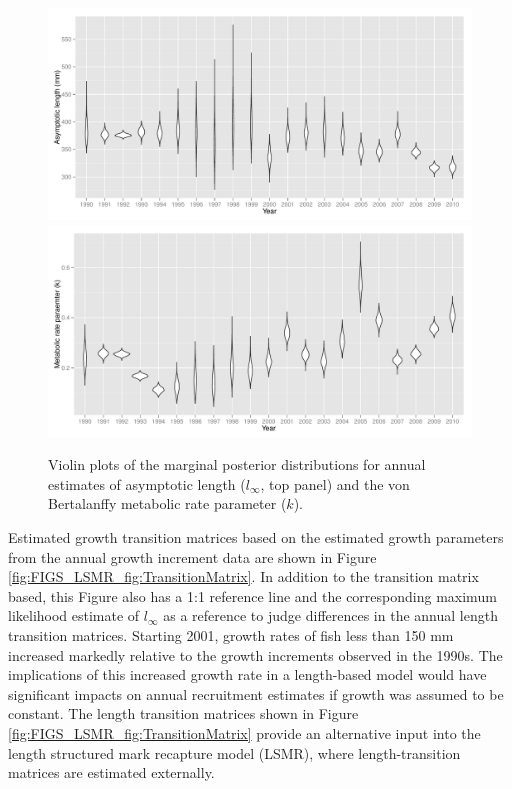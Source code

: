 \begin{figure}[htbp]
	\centering
		\includegraphics[width=6.5in]{../FIGS/LSMR/fig:LinfPosteriors.pdf}
		\includegraphics[width=6.5in]{../FIGS/LSMR/fig:kPosteriors.pdf}
	\caption{Violin plots of the marginal posterior distributions for annual estimates of asymptotic length ($l_\infty$, top panel) and the von Bertalanffy metabolic rate parameter ($k$).}
	\label{fig:FIGS_LSMR_fig:LinfPosteriors}
\end{figure}

Estimated growth transition matrices based on the estimated growth parameters from the annual growth increment data are shown in Figure \ref{fig:FIGS_LSMR_fig:TransitionMatrix}. In addition to the transition matrix based, this Figure also has a 1:1 reference line and the corresponding maximum likelihood estimate of $l_\infty$ as a reference to judge differences in the annual length transition matrices.  Starting 2001, growth rates of fish less than 150 mm increased markedly relative to the growth increments observed in the 1990s.  The implications of this increased growth rate in a length-based model would have significant impacts on annual recruitment estimates if growth was assumed to be constant.  The length transition matrices shown in Figure \ref{fig:FIGS_LSMR_fig:TransitionMatrix} provide an alternative input into the length structured mark recapture model (LSMR), where length-transition matrices are estimated externally.


